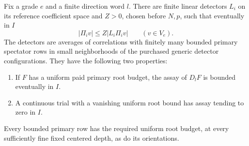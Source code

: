 \begin{lemma}
\label{lem:fullmesh-uniform-detector}
Fix a grade $e$ and a finite direction word $l$. There are finite linear
detectors $L_i$ on its reference coefficient space and $Z>0$, chosen
before $N,p$, such that eventually in $I$
\[
          |\Pi_i v|\le Z|L_i\Pi_i v|\qquad(v\in V_e).
\]
The detectors are averages of correlations with finitely many bounded
primary spectator rows in small neighborhoods of the purchased generic
detector configurations. They have the following two properties:
\begin{enumerate}
\item If $F$ has a uniform paid primary root budget, the assay of
$D_lF$ is bounded eventually in $I$.
\item A continuous trial with a vanishing uniform root bound has assay
 tending to zero in $I$.
\end{enumerate}
Every bounded primary row has the required uniform root budget, at
every sufficiently fine fixed centered depth, as do its orientations.
\end{lemma}

